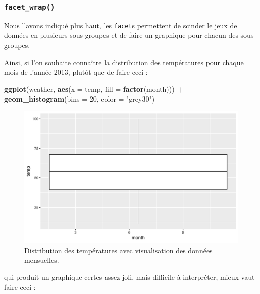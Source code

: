 \documentclass[a4paperpaper,]{article}
\newenvironment{Shaded}{\begin{snugshade}}{\end{snugshade}}
\newcommand{\KeywordTok}[1]{\textcolor[rgb]{0.13,0.29,0.53}{\textbf{#1}}}
\newcommand{\DataTypeTok}[1]{\textcolor[rgb]{0.13,0.29,0.53}{#1}}
\newcommand{\DecValTok}[1]{\textcolor[rgb]{0.00,0.00,0.81}{#1}}
\newcommand{\StringTok}[1]{\textcolor[rgb]{0.31,0.60,0.02}{#1}}
\newcommand{\OperatorTok}[1]{\textcolor[rgb]{0.81,0.36,0.00}{\textbf{#1}}}
\newcommand{\NormalTok}[1]{#1}
\theoremstyle{definition}
\theoremstyle{definition}
\theoremstyle{definition}
\theoremstyle{remark}
\begin{document}
\subsubsection{\texorpdfstring{\texttt{facet\_wrap()}}{facet\_wrap()}}\label{facet_wrap}

Nous l'avons indiqué plus haut, les \texttt{facet}s permettent de
scinder le jeux de données en plusieurs sous-groupes et de faire un
graphique pour chacun des sous-groupes.

Ainsi, si l'on souhaite connaître la distribution des températures pour
chaque mois de l'année 2013, plutôt que de faire ceci :

\begin{Shaded}
\begin{Highlighting}[]
\KeywordTok{ggplot}\NormalTok{(weather, }\KeywordTok{aes}\NormalTok{(}\DataTypeTok{x =}\NormalTok{ temp, }\DataTypeTok{fill =} \KeywordTok{factor}\NormalTok{(month))) }\OperatorTok{+}
\StringTok{  }\KeywordTok{geom_histogram}\NormalTok{(}\DataTypeTok{bins =} \DecValTok{20}\NormalTok{, }\DataTypeTok{color =} \StringTok{"grey30"}\NormalTok{)}
\end{Highlighting}
\end{Shaded}

\begin{figure}[htpb]

{\centering \includegraphics[width=0.9\linewidth]{figure/unnamed-chunk-54-1} 

}

\caption{Distribution des températures avec visualisation des données mensuelles.}\label{fig:unnamed-chunk-54}
\end{figure}

qui produit un graphique certes assez joli, mais difficile à
interpréter, mieux vaut faire ceci :
\end{document}

